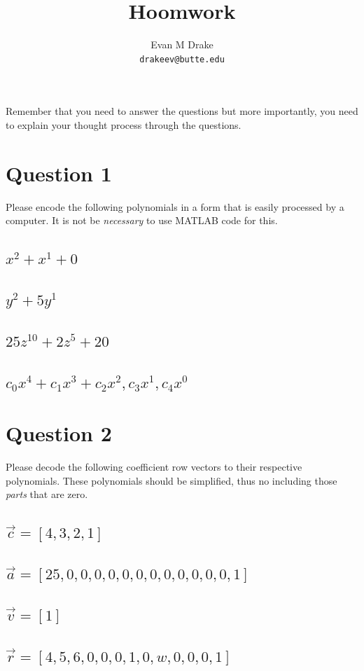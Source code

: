 \documentclass[12pt]{article}
\title{Hoomwork}
\author{
	Evan M Drake \\
	\texttt{drakeev@butte.edu}
}
\begin{document}
	\maketitle

	Remember that you need to answer the questions but more importantly,
		you need to explain your thought process through the questions.

	\section*{Question 1}
		Please encode the following polynomials in a form that is easily processed by a computer.
		It is not be \textit{necessary} to use MATLAB code for this.
		\subsection{$x^2 + x^1 + 0$}
		\subsection{$y^2 + 5y^1$}
		\subsection{$25z^10 + 2z^5 + 20$}
		\subsection{$c_0x^4 + c_1x^3 + c_2x^2, c_3x^1, c_4x^0$}

	\section*{Question 2}
		Please decode the following coefficient row vectors to their respective polynomials.
		These polynomials should be simplified,
			thus no including those \textit{parts} that are zero.
		\subsection{$\vec{c} = [4,3,2,1]$}
		\subsection{$\vec{a} = [25,0,0,0,0,0,0,0,0,0,0,0,0,1]$}
		\subsection{$\vec{v} = [1]$}
		\subsection{$\vec{r} = [4,5,6,0,0,0,1,0,w,0,0,0,1]$}
\end{document}
